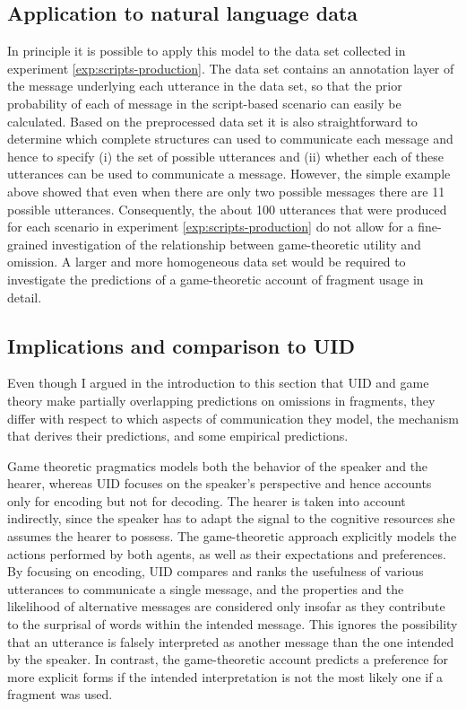 \subsection{Application to natural language data}
In principle it is possible to apply this model to the data set collected in experiment \ref{exp:scripts-production}. The data set contains an annotation layer of the message underlying each utterance in the data set, so that the prior probability of each of message in the script-based scenario can easily be calculated. Based on the preprocessed data set it is also straightforward to determine which complete structures can used to communicate each message and hence to specify (i) the set of possible utterances and (ii) whether each of these utterances can be used to communicate a message. However, the simple example above showed that even when there are only two possible messages there are 11 possible utterances. Consequently, the about 100 utterances that were produced for each scenario in experiment \ref{exp:scripts-production} do not allow for a fine-grained investigation of the relationship between game-theoretic utility and omission. A larger and more homogeneous data set would be required to investigate the predictions of a game-theoretic account of fragment usage in detail.

\subsection{Implications and comparison to UID}
Even though I argued in the introduction to this section that UID and game theory make partially overlapping predictions on omissions in fragments, they differ with respect to which aspects of communication they model, the mechanism that derives their predictions, and some empirical predictions.

Game theoretic pragmatics models both the behavior of the speaker and the hearer, whereas UID focuses on the speaker's perspective and hence accounts only for encoding but not for decoding. The hearer is taken into account indirectly, since the speaker has to adapt the signal to the cognitive resources she assumes the hearer to possess. The game-theoretic approach explicitly models the actions performed by both agents, as well as their expectations and preferences. By focusing on encoding, UID compares and ranks the usefulness of various utterances to communicate a single message, and the properties and the likelihood of alternative messages are considered only insofar as they contribute to the surprisal of words within the intended message. This ignores the possibility that an utterance is falsely interpreted as another message than the one intended by the speaker. In contrast, the game-theoretic account predicts a preference for more explicit forms if the intended interpretation is not the most likely one if a fragment was used.

